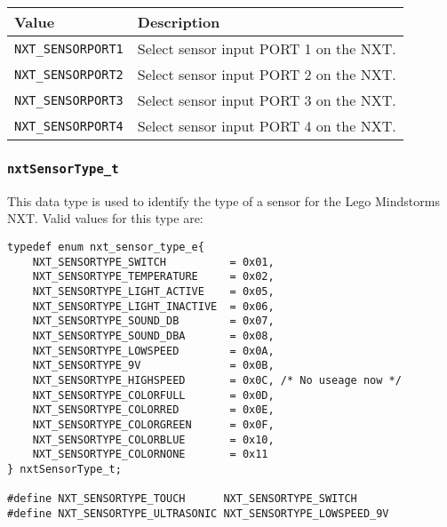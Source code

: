 \noindent
\begin{longtable}{p{3.5cm}p{12cm}}
    \hline
    Value &       Description\\
    \hline
    {\tt NXT\_SENSORPORT1}&Select sensor input PORT 1 on the NXT.\\
    {\tt NXT\_SENSORPORT2}&Select sensor input PORT 2 on the NXT.\\
    {\tt NXT\_SENSORPORT3}&Select sensor input PORT 3 on the NXT.\\
    {\tt NXT\_SENSORPORT4}&Select sensor input PORT 4 on the NXT.\\
    \hline
\end{longtable}

\subsubsection{\label{sec:nxtSensorType_t}{\tt nxtSensorType\_t}}
This data type is used to identify the type of a sensor for the Lego Mindstorms 
NXT. Valid values for this type are:
\begin{lstlisting}
typedef enum nxt_sensor_type_e{
    NXT_SENSORTYPE_SWITCH          = 0x01,
    NXT_SENSORTYPE_TEMPERATURE     = 0x02,
    NXT_SENSORTYPE_LIGHT_ACTIVE    = 0x05,
    NXT_SENSORTYPE_LIGHT_INACTIVE  = 0x06,
    NXT_SENSORTYPE_SOUND_DB        = 0x07,
    NXT_SENSORTYPE_SOUND_DBA       = 0x08,
    NXT_SENSORTYPE_LOWSPEED        = 0x0A,
    NXT_SENSORTYPE_9V              = 0x0B,
    NXT_SENSORTYPE_HIGHSPEED       = 0x0C, /* No useage now */
    NXT_SENSORTYPE_COLORFULL       = 0x0D,
    NXT_SENSORTYPE_COLORRED        = 0x0E,
    NXT_SENSORTYPE_COLORGREEN      = 0x0F,
    NXT_SENSORTYPE_COLORBLUE       = 0x10,
    NXT_SENSORTYPE_COLORNONE       = 0x11
} nxtSensorType_t;

#define NXT_SENSORTYPE_TOUCH      NXT_SENSORTYPE_SWITCH
#define NXT_SENSORTYPE_ULTRASONIC NXT_SENSORTYPE_LOWSPEED_9V
\end{lstlisting}

